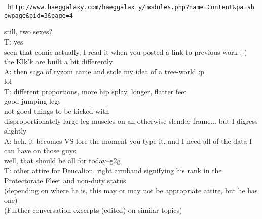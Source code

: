 \begin{verbatim} http://www.haeggalaxy.com/haeggalax y/modules.php?name=Content&pa=sh owpage&pid=3&page=4
\end{verbatim}
still, two sexes?\\
T: yes\\
seen that comic actually, I read it when you posted a link to previous work :-)\\
the Klk'k are built a bit differently\\
A: then saga of ryzom came and stole my idea of a tree-world :p\\
lol\\
T: different proportions, more hip splay, longer, flatter feet\\
good jumping legs\\
not good things to be kicked with\\
disproportionately large leg muscles on an otherwise slender frame... but I digress slightly\\
A: heh, it becomes VS lore the moment you type it, and I need all of the data I can have on those guys\\
well, that should be all for today--g2g\\
T: other attire for Deucalion, right armband signifying his rank in the Protectorate Fleet and non-duty status\\
(depending on where he is, this may or may not be appropriate attire, but he has one)\\

(Further conversation excerpts (edited) on similar topics)\\

